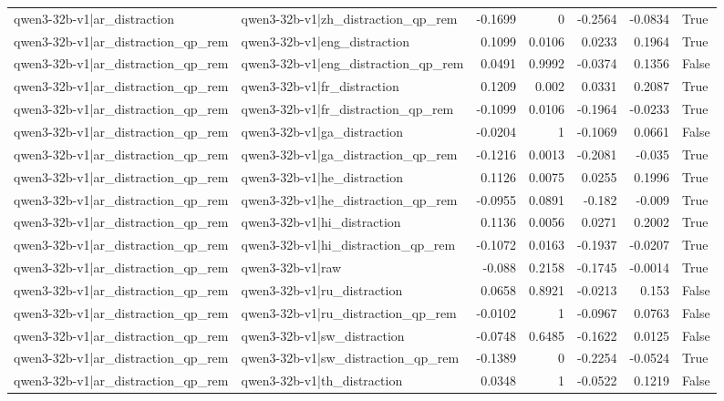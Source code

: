\begin{table}
\begin{tabular}{l l r r r r l}
qwen3-32b-v1|ar_distraction & qwen3-32b-v1|zh_distraction_qp_rem & -0.1699 & 0 & -0.2564 & -0.0834 & True \\
qwen3-32b-v1|ar_distraction_qp_rem & qwen3-32b-v1|eng_distraction & 0.1099 & 0.0106 & 0.0233 & 0.1964 & True \\
qwen3-32b-v1|ar_distraction_qp_rem & qwen3-32b-v1|eng_distraction_qp_rem & 0.0491 & 0.9992 & -0.0374 & 0.1356 & False \\
qwen3-32b-v1|ar_distraction_qp_rem & qwen3-32b-v1|fr_distraction & 0.1209 & 0.002 & 0.0331 & 0.2087 & True \\
qwen3-32b-v1|ar_distraction_qp_rem & qwen3-32b-v1|fr_distraction_qp_rem & -0.1099 & 0.0106 & -0.1964 & -0.0233 & True \\
qwen3-32b-v1|ar_distraction_qp_rem & qwen3-32b-v1|ga_distraction & -0.0204 & 1 & -0.1069 & 0.0661 & False \\
qwen3-32b-v1|ar_distraction_qp_rem & qwen3-32b-v1|ga_distraction_qp_rem & -0.1216 & 0.0013 & -0.2081 & -0.035 & True \\
qwen3-32b-v1|ar_distraction_qp_rem & qwen3-32b-v1|he_distraction & 0.1126 & 0.0075 & 0.0255 & 0.1996 & True \\
qwen3-32b-v1|ar_distraction_qp_rem & qwen3-32b-v1|he_distraction_qp_rem & -0.0955 & 0.0891 & -0.182 & -0.009 & True \\
qwen3-32b-v1|ar_distraction_qp_rem & qwen3-32b-v1|hi_distraction & 0.1136 & 0.0056 & 0.0271 & 0.2002 & True \\
qwen3-32b-v1|ar_distraction_qp_rem & qwen3-32b-v1|hi_distraction_qp_rem & -0.1072 & 0.0163 & -0.1937 & -0.0207 & True \\
qwen3-32b-v1|ar_distraction_qp_rem & qwen3-32b-v1|raw & -0.088 & 0.2158 & -0.1745 & -0.0014 & True \\
qwen3-32b-v1|ar_distraction_qp_rem & qwen3-32b-v1|ru_distraction & 0.0658 & 0.8921 & -0.0213 & 0.153 & False \\
qwen3-32b-v1|ar_distraction_qp_rem & qwen3-32b-v1|ru_distraction_qp_rem & -0.0102 & 1 & -0.0967 & 0.0763 & False \\
qwen3-32b-v1|ar_distraction_qp_rem & qwen3-32b-v1|sw_distraction & -0.0748 & 0.6485 & -0.1622 & 0.0125 & False \\
qwen3-32b-v1|ar_distraction_qp_rem & qwen3-32b-v1|sw_distraction_qp_rem & -0.1389 & 0 & -0.2254 & -0.0524 & True \\
qwen3-32b-v1|ar_distraction_qp_rem & qwen3-32b-v1|th_distraction & 0.0348 & 1 & -0.0522 & 0.1219 & False \\

\end{tabular}
\end{table}
